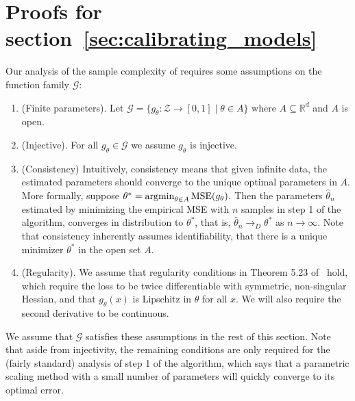 \newpage
\section{Proofs for section~\ref{sec:calibrating_models}}
\label{sec:calibrating_models_appendix}

\newcommand{\G}[0]{\ensuremath{\mathcal{G}}}

Our analysis of the sample complexity of \ourcal{} requires some assumptions on the function family $\G{}$:

\begin{enumerate}
\item (Finite parameters). Let $\G{} = \{ g_{\theta} : \mathcal{Z} \to [0, 1] \; | \; \theta \in A \}$ where $A \subseteq \mathbb{R}^{d}$ and $A$ is open.
\item (Injective). For all $g_{\theta} \in \G{}$ we assume $g_{\theta}$ is injective.
\item (Consistency) Intuitively, consistency means that given infinite data, the estimated parameters should converge to the unique optimal parameters in $A$.
More formally, suppose $\theta^* = \mathop{\mbox{argmin}}_{\theta \in A} \mbox{MSE}(g_{\theta})$.
Then the parameters $\hat{\theta}_n$ estimated by minimizing the empirical MSE with $n$ samples in step 1 of the algorithm, converges in distribution to $\theta^*$, that is, $\hat{\theta}_n \to_D \theta^*$ as $n \to \infty$. Note that consistency inherently assumes identifiability, that there is a unique minimizer $\theta^*$ in the open set $A$.
\item (Regularity). We assume that regularity conditions in Theorem 5.23 of~\cite{vaart98asymptotic} hold, which require the loss to be twice differentiable with symmetric, non-singular Hessian, and that $g_{\theta}(x)$ is Lipschitz in $\theta$ for all $x$. We will also require the second derivative to be continuous.
\end{enumerate}

We assume that $\G{}$ satisfies these assumptions in the rest of this section. Note that aside from injectivity, the remaining conditions are only required for the (fairly standard) analysis of step 1 of the algorithm, which says that a parametric scaling method with a small number of parameters will quickly converge to its optimal error.


